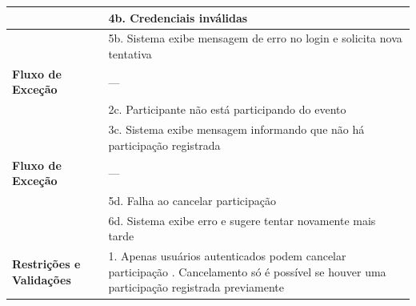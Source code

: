 \documentclass[12pt,a4paper]{article}
\begin{document}
\begin{longtable}{|p{4cm}|p{11cm}|}
& 4b. Credenciais inválidas \\ \hline
& 5b. Sistema exibe mensagem de erro no login e solicita nova tentativa \\ \hline
\textbf{Fluxo de Exceção} & --- \\ \hline
& 2c. Participante não está participando do evento \\ \hline
& 3c. Sistema exibe mensagem informando que não há participação registrada \\ \hline
\textbf{Fluxo de Exceção} & --- \\ \hline
& 5d. Falha ao cancelar participação \\ \hline
& 6d. Sistema exibe erro e sugere tentar novamente mais tarde \\ \hline
\textbf{Restrições e Validações} & 1. Apenas usuários autenticados podem cancelar participação \newline 2. Cancelamento só é possível se houver uma participação registrada previamente \\ \hline
\end{longtable}

\vspace{1cm}
\end{document}
